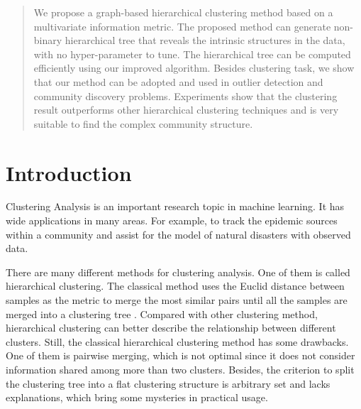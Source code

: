 

\date{Received: date / Accepted: date}


\maketitle

\begin{abstract}
We propose a graph-based hierarchical clustering method based on a multivariate information metric.
The proposed method can generate non-binary hierarchical tree that reveals the intrinsic structures in the data, with no hyper-parameter to tune. 
The hierarchical tree can be computed efficiently using
our improved algorithm. Besides clustering task, we show that our method can be adopted and
used in outlier detection and community discovery problems.
Experiments show that the clustering result outperforms
other hierarchical clustering techniques and is very suitable to find the complex community structure.
\end{abstract}

\section{Introduction}
\label{intro}
Clustering Analysis is an important research topic in machine learning.
It has wide applications in many areas. For example, to track the epidemic
sources within a community and assist for the model of natural disasters with observed data.

There are many different methods for clustering analysis. One of them is called
hierarchical clustering. The classical method uses the Euclid distance between samples
as the metric to merge the most similar pairs until all the samples are merged into a clustering
tree \citep{slink}. Compared with other clustering method, hierarchical clustering can better describe the relationship between different clusters. Still, the classical hierarchical clustering method has some
drawbacks. One of them is pairwise merging, which is not optimal since it does not consider information shared among more than two clusters. Besides, the criterion to split the clustering tree into a flat clustering structure is arbitrary set and lacks explanations, which bring some mysteries in practical
usage.


